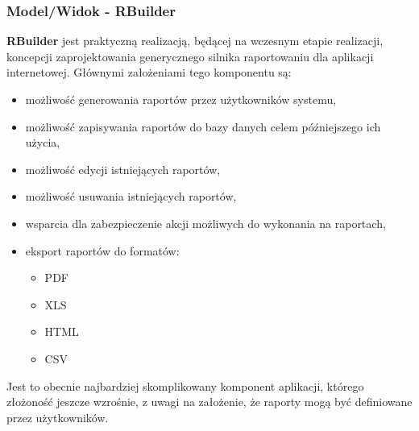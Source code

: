 		\subsubsection{Model/Widok - RBuilder}
			\textbf{RBuilder} jest praktyczną realizacją, będącej na wczesnym etapie realizacji, koncepcji zaprojektowania generycznego
			silnika raportowaniu dla aplikacji internetowej. Głównymi założeniami tego komponentu są:
			\begin{itemize}
				\item możliwość generowania raportów przez użytkowników systemu,
				\item możliwość zapisywania raportów do bazy danych celem późniejszego ich użycia,
				\item możliwość edycji istniejących raportów,
				\item możliwość usuwania istniejących raportów,
				\item wsparcia dla zabezpieczenie akcji możliwych do wykonania na raportach,
				\item eksport raportów do formatów:
				\begin{itemize}	\label{app:rbuilder_representations}
					\item PDF
					\item XLS
					\item HTML
					\item CSV
				\end{itemize}
			\end{itemize}		
			Jest to obecnie najbardziej skomplikowany komponent aplikacji, którego złożoność jeszcze wzrośnie, z uwagi
			na założenie, że raporty mogą być definiowane przez użytkowników. 
			
